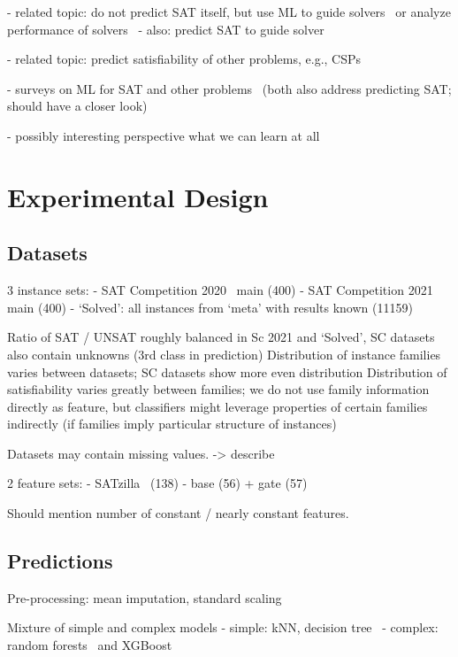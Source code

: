 \documentclass{article}
\begin{document}
- related topic: do not predict SAT itself, but use ML to guide solvers~\cite{amizadeh2019pdp} or analyze performance of solvers~\cite{hutter2013identifying}
- also: predict SAT to guide solver~\cite{wu2017improving}

- related topic: predict satisfiability of other problems, e.g., CSPs~\cite{xu2018towards, liu2020learning}

- surveys on ML for SAT and other problems~\cite{amrani2018ml, popescu2021overview} (both also address predicting SAT; should have a closer look)

- possibly interesting perspective what we can learn at all~\cite{yehuda2020its}

\section{Experimental Design}
\label{sec:experimental-design}

\subsection{Datasets}

3 instance sets:
- SAT Competition 2020~\cite{balyo2020proceedings} main (400)
- SAT Competition 2021~\cite{balyo2021proceedings} main (400)
- `Solved': all instances from `meta' with results known (11159)

Ratio of SAT / UNSAT roughly balanced in Sc 2021 and `Solved', SC datasets also contain unknowns (3rd class in prediction)
Distribution of instance families varies between datasets; SC datasets show more even distribution
Distribution of satisfiability varies greatly between families; we do not use family information directly as feature, but classifiers might leverage properties of certain families indirectly (if families imply particular structure of instances)

Datasets may contain missing values. -> describe

2 feature sets:
- SATzilla~\cite{xu2012features} (138)
- base (56) + gate (57)

Should mention number of constant / nearly constant features.

\subsection{Predictions}

Pre-processing: mean imputation, standard scaling

Mixture of simple and complex models
- simple: kNN, decision tree~\cite{breiman1984classification}
- complex: random forests~\cite{breiman2001random} and XGBoost~\cite{chen2016xgboost}
\end{document}
